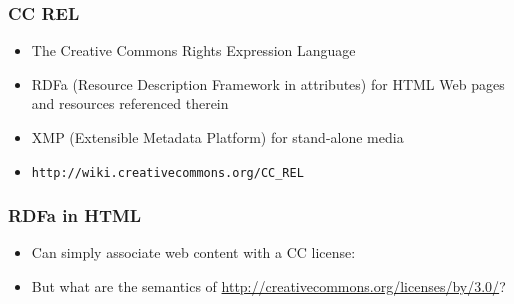 \documentclass[mathserif,xcolor=dvipsnames,hyperref={bookmarks=true}]{beamer}
\begin{document}
    \begin{frame}[t]
        \frametitle{CC REL}
        \begin{itemize}
            \item The Creative Commons Rights Expression Language
            \item RDFa (Resource Description Framework in attributes) for HTML
            Web pages and resources referenced therein
            \item XMP (Extensible Metadata Platform) for stand-alone media
            \item \texttt{http://wiki.creativecommons.org/CC\_REL}
        \end{itemize}
    \end{frame}

\begin{frame}[fragile]
\frametitle{RDFa in HTML}
        \begin{itemize}
            \item Can simply associate web content with a CC license:
        \end{itemize}

        \begin{itemize}
            \item But what are the semantics of \url{http://creativecommons.org/licenses/by/3.0/}?
        \end{itemize}
\end{frame}
\end{document}
